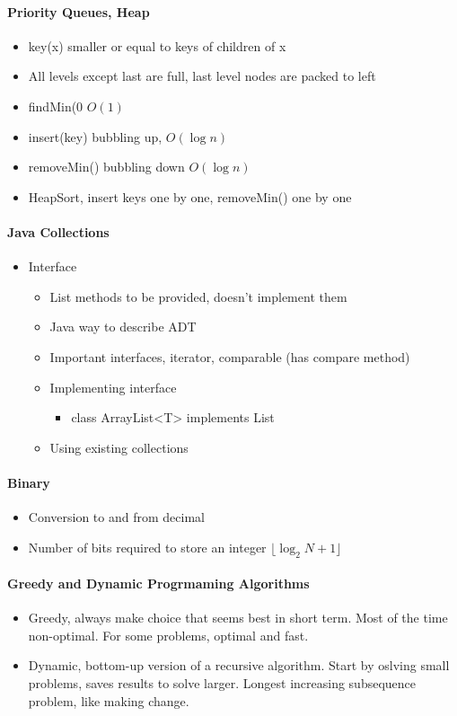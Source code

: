 \documentclass[12 pt]{article}
\theoremstyle{definition}
\begin{document}
  \paragraph{Priority Queues, Heap}
  \begin{itemize}
  \item key(x) smaller or equal to keys of children of x
  \item All levels except last are full, last level nodes are packed to left
  \item findMin(0 $O(1)$
  \item insert(key) bubbling up, $O(\log n)$
  \item removeMin() bubbling down $O(\log n)$
    \item HeapSort, insert keys one by one, removeMin() one by one
    \end{itemize}
    \paragraph{Java Collections}
    \begin{itemize}
    \item Interface
      \begin{itemize}
      \item List methods to be provided, doesn't implement them
      \item Java way to describe ADT
      \item Important interfaces, iterator, comparable (has compare method)
      \item Implementing interface
        \begin{itemize}
        \item class ArrayList<T> implements List
        \end{itemize}
        \item Using existing collections
      \end{itemize}
    \end{itemize}
    \paragraph{Binary}
    \begin{itemize}
    \item Conversion to and from decimal
      \item Number of bits required to store an integer $\lfloor \log_2{N} +1 \rfloor$ 
      \end{itemize}
      \paragraph{Greedy and Dynamic Progrmaming Algorithms}
      \begin{itemize}
      \item Greedy, always make choice that seems best in short term. Most of the time non-optimal. For some problems, optimal and fast.
        \item Dynamic, bottom-up version of a recursive algorithm. Start by oslving small problems, saves results to solve larger. Longest increasing subsequence problem, like making change.
        \end{itemize}
\end{document}
